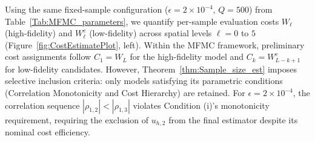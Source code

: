 Using the same fixed-sample configuration ($\epsilon=2\times10^{-4}$, $Q=500$) from Table~\ref{Tab:MFMC_parameters}, we quantify per-sample evaluation costs $W_\ell$ (high-fidelity) and $W_\ell^e$ (low-fidelity) across spatial levels $\ell=0$ to $5$ (Figure~\ref{fig:CostEstimatePlot}, left). Within the MFMC framework, preliminary cost assignments follow $C_1 = W_L$ for the high-fidelity model and $C_k = W_{L-k+1}^e$ for low-fidelity candidates. However, Theorem~\ref{thm:Sample_size_est} imposes selective inclusion criteria: only models satisfying its parametric conditions (Correlation Monotonicity and Cost Hierarchy) are retained. For $\epsilon=2\times10^{-4}$, the correlation sequence $|\rho_{1,2}| < |\rho_{1,3}|$ violates Condition (i)'s monotonicity requirement, requiring the exclusion of $u_{h,2}$ from the final estimator despite its nominal cost efficiency.


